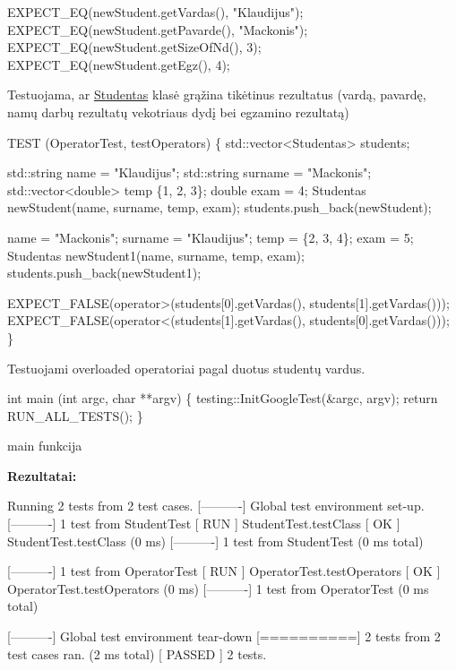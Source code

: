 \begin{DoxyItemize}
\begin{DoxyCode}
    EXPECT\_EQ(newStudent.getVardas(), "Klaudijus");
    EXPECT\_EQ(newStudent.getPavarde(), "Mackonis");
    EXPECT\_EQ(newStudent.getSizeOfNd(), 3);
    EXPECT\_EQ(newStudent.getEgz(), 4);
\end{DoxyCode}

\item Testuojama, ar {\ttfamily \hyperlink{classStudentas}{Studentas}} klasė grąžina tikėtinus rezultatus (vardą, pavardę, namų darbų rezultatų vekotriaus dydį bei egzamino rezultatą) 
\begin{DoxyCode}
TEST (OperatorTest, testOperators)
\{
    std::vector<Studentas> students;

    std::string name = "Klaudijus";
    std::string surname = "Mackonis";
    std::vector<double> temp \{1, 2, 3\};
    double exam = 4;
    Studentas newStudent(name, surname, temp, exam);
    students.push\_back(newStudent);

    name = "Mackonis";
    surname = "Klaudijus";
    temp = \{2, 3, 4\};
    exam = 5;
    Studentas newStudent1(name, surname, temp, exam);
    students.push\_back(newStudent1);

    EXPECT\_FALSE(operator>(students[0].getVardas(), students[1].getVardas()));
    EXPECT\_FALSE(operator<(students[1].getVardas(), students[0].getVardas()));
\}
\end{DoxyCode}

\item Testuojami {\ttfamily overloaded} operatoriai pagal duotus studentų vardus. 
\begin{DoxyCode}
int main (int argc, char **argv)
\{
    testing::InitGoogleTest(&argc, argv);
    return RUN\_ALL\_TESTS();
\}
\end{DoxyCode}

\item {\ttfamily main} funkcija
\end{DoxyItemize}

{\bfseries Rezultatai\+:} 
\begin{DoxyCode}
[==========] Running 2 tests from 2 test cases.
[----------] Global test environment set-up.
[----------] 1 test from StudentTest
[ RUN      ] StudentTest.testClass
[       OK ] StudentTest.testClass (0 ms)
[----------] 1 test from StudentTest (0 ms total)

[----------] 1 test from OperatorTest
[ RUN      ] OperatorTest.testOperators
[       OK ] OperatorTest.testOperators (0 ms)
[----------] 1 test from OperatorTest (0 ms total)

[----------] Global test environment tear-down
[==========] 2 tests from 2 test cases ran. (2 ms total)
[  PASSED  ] 2 tests.
\end{DoxyCode}


